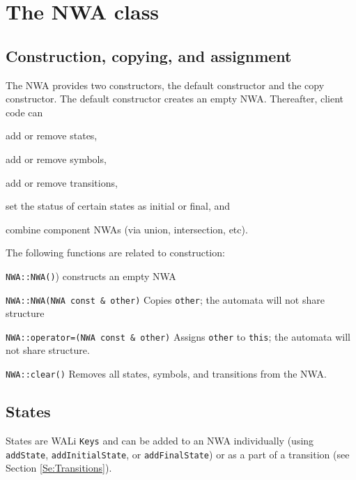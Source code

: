 \section{The NWA class}

\subsection{Construction, copying, and assignment}
\label{Se:Construction}

The NWA provides two constructors, the default constructor and the copy
constructor. The default constructor creates an empty NWA. Thereafter, 
client code can \begin{inparaenum} \item add or remove states, \item add or remove
symbols, \item add or remove transitions, \item set the status of certain
  states as initial or final, and \item combine component NWAs (via union,
  intersection, etc). \end{inparaenum}


The following functions are related to construction:
\begin{description}
  \item \texttt{NWA::NWA()}) constructs an empty NWA

  \item \texttt{NWA::NWA(NWA const \& other)} Copies \texttt{other}; the
    automata will not share structure

  \item \texttt{NWA::operator=(NWA const \& other)} Assigns \texttt{other} to \texttt{this};
    the automata will not share structure.

  \item \texttt{NWA::clear()} \nopagebreak
    Removes all states, symbols, and transitions from the NWA.

\end{description}



\subsection{States}
\label{Se:States}

States are WALi \texttt{Keys} and can be added to an NWA
individually (using \texttt{addState}, \texttt{addInitialState}, or
\texttt{addFinalState}) or as a part of a transition (see Section
\ref{Se:Transitions}).  

